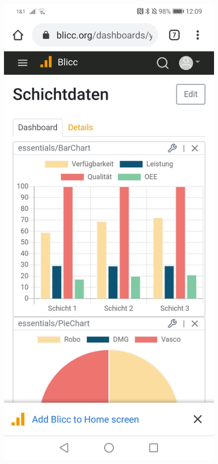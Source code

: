 \begin{figure}[h]
    \centering
    \includegraphics[scale=0.15]{img/android/Browser}\hspace{1em}

\end{figure}
